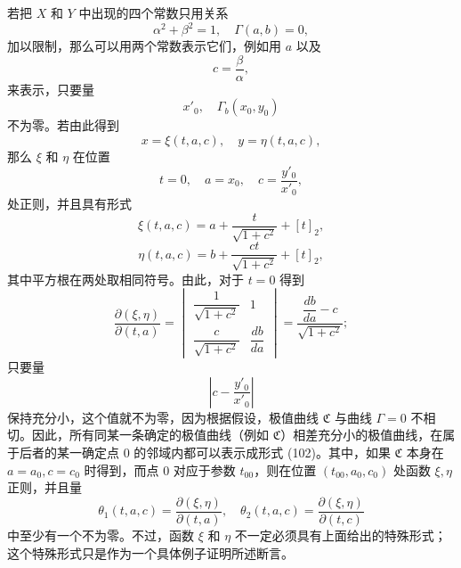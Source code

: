 \documentclass[11pt,a4paper,leqno]{article}
\begin{document}
若把 $X$ 和 $Y$ 中出现的四个常数只用关系
\[
\alpha^2+\beta^2=1,
\quad
\Gamma(a,b)=0,
\]
加以限制，那么可以用两个常数表示它们，例如用 $a$ 以及
\[
c=\frac{\beta}{\alpha},
\]
来表示，只要量
\[
x'_0,
\quad
\Gamma_b(x_0,y_0)
\]
不为零。若由此得到
\begin{equation}\tag{102}
x=\xi(t,a,c),
\quad
y=\eta(t,a,c),
\end{equation}
那么 $\xi$ 和 $\eta$ 在位置
\[
t=0,
\quad
a=x_0,
\quad
c=\frac{y'_0}{x'_0},
\]
处正则，并且具有形式
\[
\xi(t,a,c)=a+\frac{t}{\sqrt{1+c^2}}+[t]_2,
\]
\[
\eta(t,a,c)=b+\frac{ct}{\sqrt{1+c^2}}+[t]_2,
\]
其中平方根在两处取相同符号。由此，对于 $t=0$ 得到
\[
\frac{\partial(\xi,\eta)}{\partial(t,a)}=
\begin{vmatrix}
\dfrac{1}{\sqrt{1+c^2}}&1\\[1.2ex]
\dfrac{c}{\sqrt{1+c^2}}&\dfrac{db}{da}
\end{vmatrix}
=\frac{\dfrac{db}{da}-c}{\sqrt{1+c^2}};
\]
只要量
\[
\left|c-\frac{y'_0}{x'_0}\right|
\]
保持充分小，这个值就不为零，因为根据假设，极值曲线 $\mathfrak C$ 与曲线 $\Gamma=0$ 不相切。因此，所有同某一条确定的极值曲线（例如 $\mathfrak C$）相差充分小的极值曲线，在属于后者的某一确定点 0 的邻域内都可以表示成形式 (102)。其中，如果 $\mathfrak C$ 本身在 $a=a_0,c=c_0$ 时得到，而点 0 对应于参数 $t_{00}$，则在位置 $(t_{00},a_0,c_0)$ 处函数 $\xi,\eta$ 正则，并且量
\[
\theta_1(t,a,c)=\frac{\partial(\xi,\eta)}{\partial(t,a)},
\quad
\theta_2(t,a,c)=\frac{\partial(\xi,\eta)}{\partial(t,c)}
\]
中至少有一个不为零。不过，函数 $\xi$ 和 $\eta$ 不一定必须具有上面给出的特殊形式；这个特殊形式只是作为一个具体例子证明所述断言。
\end{document}
